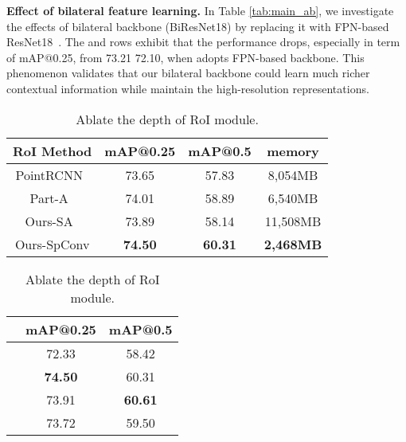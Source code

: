 \documentclass{article}
\begin{document}
\textbf{Effect of bilateral feature learning.} In Table \ref{tab:main_ab}, we investigate the effects of bilateral backbone (BiResNet18) by replacing it with FPN-based ResNet18~\cite{rukhovich2021fcaf3d,gwak2020generative}. The  and  rows exhibit that the performance drops, especially in term of mAP@0.25, from 73.21  72.10, when adopts FPN-based backbone. This phenomenon validates that our bilateral backbone could learn much richer contextual information while maintain the high-resolution representations.

\begin{table}[t]
  \hspace{-8pt}
  \begin{minipage}[b]{0.6\linewidth}
  	\caption{Comparison with other RoI pooling approaches.}
  	\label{tab:roi_ab}
  	\small
  	\centering
   	\begin{tabular}{cccc}
    	\toprule
    	RoI Method &mAP@0.25 & mAP@0.5 & memory\\
    	\midrule
    	PointRCNN~\cite{shi2019pointrcnn}   & 73.65        & 57.83    & 8,054MB    \\
    	Part-A~\cite{shi2020p2}         & 74.01        & 58.89   & 6,540MB   \\
    	Ours-SA~\cite{qi2018pointnnetplus}	      & 73.89        & 58.14   & 11,508MB     \\
    	Ours-SpConv		  & \textbf{74.50}        & \textbf{60.31}    & \textbf{2,468MB}  \\
    	\bottomrule
  	\end{tabular}
  \end{minipage}
  \hspace{0pt}
  \begin{minipage}[b]{0.4\linewidth}
  	\caption{Ablate the depth of RoI module.}
  	\label{tab:depth_ab}
  	\small
  	\centering
  	\begin{tabular}{ccc}
    	\toprule
    	  & mAP@0.25 & mAP@0.5 \\
    	\midrule
    			    & 72.33        & 58.42      \\
    			    & \textbf{74.50}        & 60.31      \\
    			    & 73.91        & \textbf{60.61}      \\
    			    & 73.72        & 59.50      \\
    	\bottomrule
  	\end{tabular}
  \end{minipage}
\end{table}
\end{document}
